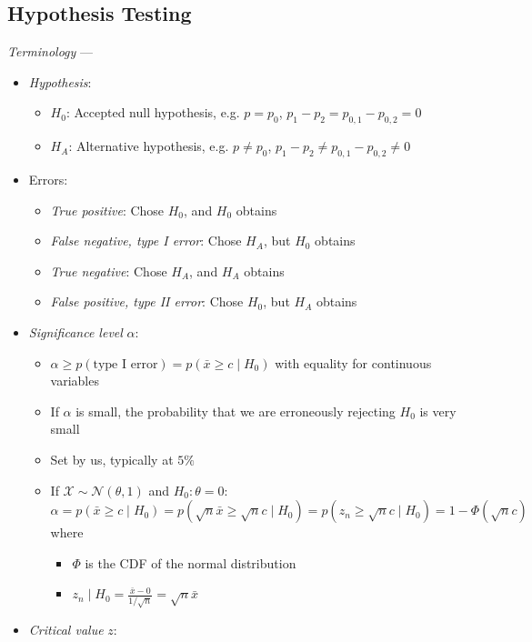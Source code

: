 \subsection*{Hypothesis Testing}
\emph{Terminology} ---
\begin{itemize}
    \item \emph{Hypothesis}:
    \begin{itemize}
        \item $H_0$: Accepted null hypothesis, e.g. $p=p_0$, $p_1-p_2=p_{0,1}-p_{0,2}=0$
        \item $H_A$: Alternative hypothesis, e.g. $p \neq p_0$, $p_1-p_2 \neq p_{0,1}-p_{0,2} \neq 0$
    \end{itemize}
    \item Errors:
    \begin{itemize}
        \item \emph{True positive}: Chose $H_0$, and $H_0$ obtains
        \item \emph{False negative, type I error}: Chose $H_A$, but $H_0$ obtains
        \item \emph{True negative}: Chose $H_A$, and $H_A$ obtains
        \item \emph{False positive, type II error}: Chose $H_0$, but $H_A$ obtains
    \end{itemize}
    \item \emph{Significance level} $\alpha$: 
    \begin{itemize}
        \item $\alpha \geq p(\textrm{type I error}) = p(\bar{x} \geq c \mid H_0)$ with equality for continuous variables 
        \item If $\alpha$ is small, the probability that we are erroneously rejecting $H_0$ is very small
        \item Set by us, typically at $5\%$
        \item If $\mathcal{X} \sim \mathcal{N}(\theta,1)$ and $H_0: \theta = 0$:
        $\alpha = p(\bar{x} \geq c \mid H_0) = p(\sqrt{n}\bar{x} \geq \sqrt{n}c \mid H_0) = p(z_n \geq \sqrt{n}c \mid H_0) = 1-\Phi(\sqrt{n}c)$ 
        where 
        \begin{itemize}
            \item $\Phi$ is the CDF of the normal distribution 
            \item $z_n \mid H_0 = \frac{\bar{x}-0}{1/\sqrt{n}} = \sqrt{n}\bar{x}$
        \end{itemize}
    \end{itemize}
    \item \emph{Critical value} $z$: 

\end{itemize}
